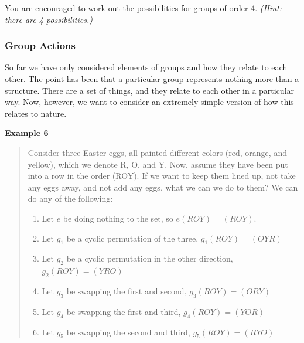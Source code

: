 \documentclass[12pt,epsf]{article}
\begin{document}
You are encouraged to work out the possibilities for groups of order 4.
\it (Hint: there are 4 possibilities.)\rm  

\subsubsection{Group Actions}

So far we have only considered elements of groups and how they relate
to each other.	The point has been that a particular group represents
nothing more than a structure.	There are a set of things, and they
relate to each other in a particular way.  Now, however, we want to
consider an extremely simple version of how this relates to nature.  

\newpage
\bf Example 6 \rm
\vspace*{-2ex}
\begin{quote}
Consider three Easter eggs, all painted different
colors (red, orange, and yellow), which we denote R, O, and Y.	Now,
assume they have been put into a row in the order (ROY).  If we want to
keep them lined up, not take any eggs away, and not add any eggs, what
we can we do to them?  We can do any of the following:
\begin{enumerate}
\item Let $e$ be doing nothing to the set, so $e(ROY) = (ROY)$. 
\item Let $g_1$ be a cyclic permutation of the three, $g_1(ROY) =
(OYR)$
\item Let $g_2$ be a cyclic permutation in the other direction,
$g_2(ROY)=(YRO)$
\item Let $g_3$ be swapping the first and second, $g_3(ROY) =
(ORY)$
\item Let $g_4$ be swapping the first and third, $g_4(ROY) =
(YOR)$
\item Let $g_5$ be swapping the second and third, $g_5(ROY) =
(RYO)$
\end{enumerate}


\end{quote}
\end{document}
